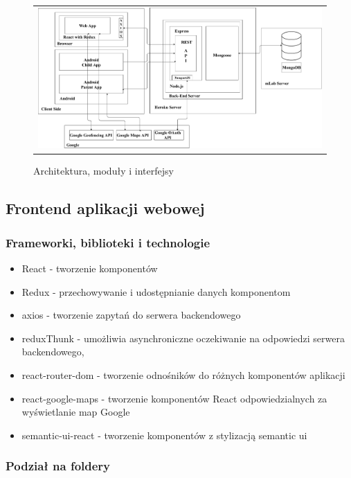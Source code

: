 \documentclass{sprawozdanie-agh}
\begin{document}
		\begin{figure}[H] 
			\centering
			\begin{tabular}{c}
				\includegraphics[width=.95\textwidth]{moduly_interfejsy_komunikacyjne}
			\end{tabular} 
			\caption{Architektura, moduły i interfejsy}
		\end{figure}

		\subsection{Frontend aplikacji webowej}

			\subsubsection{Frameworki, biblioteki i technologie}

				\begin{itemize}
					\item React - tworzenie komponentów
					\item Redux - przechowywanie i udostępnianie danych komponentom
					\item axios - tworzenie zapytań do serwera backendowego
					\item reduxThunk - umożliwia asynchroniczne oczekiwanie na odpowiedzi serwera backendowego,
					\item react-router-dom - tworzenie odnośników do różnych komponentów aplikacji
					\item react-google-maps - tworzenie komponentów React odpowiedzialnych za wyświetlanie map Google
					\item semantic-ui-react - tworzenie komponentów z stylizacją semantic ui
				\end{itemize}

			\subsubsection{Podział na foldery}
\end{document}
